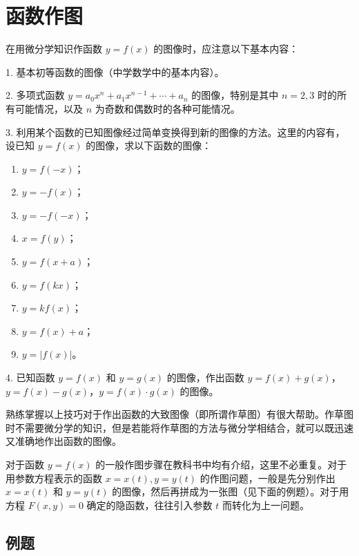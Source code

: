 \section{函数作图}

在用微分学知识作函数 $y=f(x)$ 的图像时，应注意以下基本内容：

1. 基本初等函数的图像（中学数学中的基本内容）。

2. 多项式函数 $y=a_0x^n+a_1x^{n-1}+\cdots+a_n$ 的图像，特别是其中 $n=2,3$ 时的所有可能情况，以及 $n$ 为奇数和偶数时的各种可能情况。

3. 利用某个函数的已知图像经过简单变换得到新的图像的方法。这里的内容有，设已知 $y=f(x)$ 的图像，求以下函数的图像：
\begin{enumerate}[label=(\arabic*)]
  \item $y=f(-x)$；
  \item $y=-f(x)$；
  \item $y=-f(-x)$；
  \item $x=f(y)$；
  \item $y=f(x+a)$；
  \item $y=f(kx)$；
  \item $y=kf(x)$；
  \item $y=f(x)+a$；
  \item $y=|f(x)|$。
\end{enumerate}

4. 已知函数 $y=f(x)$ 和 $y=g(x)$ 的图像，作出函数 $y=f(x)+g(x)$，$y=f(x)-g(x)$，$y=f(x)\cdot g(x)$ 的图像。

\begin{xremark}
熟练掌握以上技巧对于作出函数的大致图像（即所谓作草图）有很大帮助。作草图时不需要微分学的知识，但是若能将作草图的方法与微分学相结合，就可以既迅速又准确地作出函数的图像。
\end{xremark}

对于函数 $y=f(x)$ 的一般作图步骤在教科书中均有介绍，这里不必重复。对于用参数方程表示的函数 $x=x(t),y=y(t)$ 的作图问题，一般是先分别作出 $x=x(t)$ 和 $y=y(t)$ 的图像，然后再拼成为一张图（见下面的例题）。对于用方程 $F(x,y)=0$ 确定的隐函数，往往引入参数 $t$ 而转化为上一问题。

\subsection{例题}

